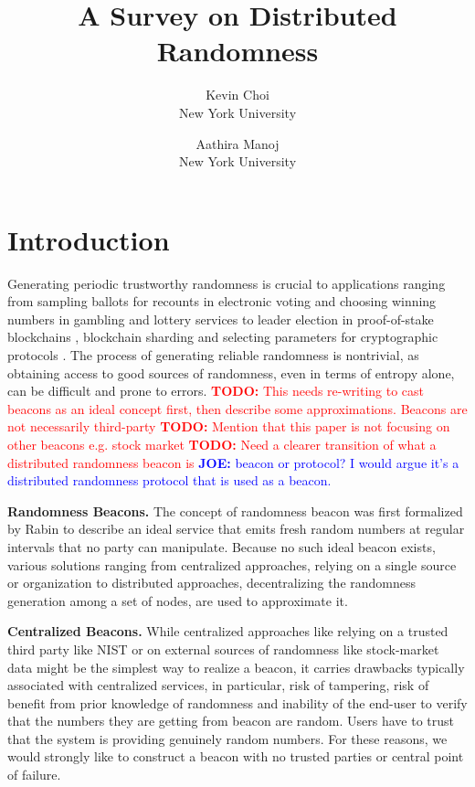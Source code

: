 \documentclass[letterpaper,twocolumn,10pt]{article}
\title{\Large \bf A Survey on Distributed Randomness}
\author{
{\rm Kevin Choi}\\
New York University
\and
{\rm Aathira Manoj}\\
New York University
}
\theoremstyle{definition}
\theoremstyle{remark}
\newcommand{\todo}[1]{\textcolor{red}{\textbf{TODO:} #1}}
\newcommand{\joenote}[1]{\textcolor{blue}{\textbf{JOE:} #1}}
\begin{document}
\maketitle
\tableofcontents

\section{Introduction}
Generating periodic trustworthy randomness is crucial to applications ranging from sampling ballots for recounts in electronic voting \cite{adida2008helios} and choosing winning numbers in gambling and lottery services \cite{bonneau2015bitcoin} to leader election in proof-of-stake blockchains \cite{gilad2017algorand, kiayias2017ouroboros}, blockchain sharding \cite{al2017chainspace, kokoris2018omniledger, luu2016secure} and selecting parameters for cryptographic protocols \cite{baigneres2015trap, lenstra2015random}. The process of generating reliable randomness is nontrivial, as obtaining access to good sources of randomness, even in terms of entropy alone, can be difficult and prone to errors.
\todo{This needs re-writing to cast beacons as an ideal concept first, then describe some approximations. Beacons are not necessarily third-party}
\todo{Mention that this paper is not focusing on other beacons e.g. stock market}
\todo{Need a clearer transition of what a distributed randomness beacon is} \joenote{beacon or protocol? I would argue it's a distributed randomness protocol that is used as a beacon.}

\textbf{Randomness Beacons.} The concept of randomness beacon was first formalized by Rabin \cite{rabin1983Rabin} to describe an ideal service that emits fresh random numbers at regular intervals that no party can manipulate. Because no such ideal beacon exists, various solutions ranging from  centralized approaches, relying on a single source or organization to distributed approaches, decentralizing the randomness generation among a set of nodes, are used to approximate it. 

\textbf{Centralized Beacons.} While centralized approaches like relying on a trusted third party like NIST \cite{fischer2011public} or on external sources of randomness like stock-market data \cite{clark2010use} might be the simplest way to realize a beacon, it carries drawbacks typically associated with centralized services, in particular, risk of tampering, risk of benefit from prior knowledge of randomness and inability of the end-user to verify that the numbers they are getting from beacon are random. Users have to trust that the system is providing genuinely random numbers. For these reasons, we would strongly like to construct a beacon with no trusted parties or central point of failure. 
\end{document}
